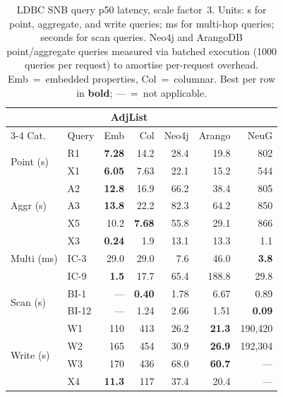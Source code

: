 \begin{table}[t]
  \centering
  \footnotesize
  \setlength{\tabcolsep}{3pt}
  \begin{tabular*}{\columnwidth}{@{\extracolsep{\fill}}ll rrrrr@{}}
    \toprule
    & & \multicolumn{2}{c}{\project{} AdjList} & & & \\
    \cmidrule(lr){3-4}
    Cat. & Query & Emb & Col & Neo4j & Arango & NeuG \\
    \midrule
    \multirow{2}{*}{Point (\textmu{}s)}
    & R1   & \textbf{7.28}  & 14.2  & 28.4  & 19.8  & 802 \\
    & X1   & \textbf{6.05}  & 7.63  & 22.1  & 15.2  & 544 \\
    \midrule
    \multirow{3}{*}{Aggr (\textmu{}s)}
    & A2   & \textbf{12.8}  & 16.9  & 66.2  & 38.4  & 805 \\
    & A3   & \textbf{13.8}  & 22.2  & 82.3  & 64.2  & 850 \\
    & X5   & 10.2  & \textbf{7.68}  & 55.8  & 29.1  & 866 \\
    \midrule
    \multirow{3}{*}{Multi (ms)}
    & X3   & \textbf{0.24}  & 1.9  & 13.1  & 13.3  & 1.1 \\
    & IC-3   & 29.0  & 29.0  & 7.6  & 46.0  & \textbf{3.8} \\
    & IC-9   & \textbf{1.5}  & 17.7  & 65.4  & 188.8  & 29.8 \\
    \midrule
    \multirow{2}{*}{Scan (s)}
    & BI-1   & ---  & \textbf{0.40}  & 1.78  & 6.67  & 0.89 \\
    & BI-12   & ---  & 1.24  & 2.66  & 1.51  & \textbf{0.09} \\
    \midrule
    \multirow{4}{*}{Write (\textmu{}s)}
    & W1   & 110  & 413  & 26.2  & \textbf{21.3}  & 190{,}420 \\
    & W2   & 165  & 454  & 30.9  & \textbf{26.9}  & 192{,}304 \\
    & W3   & 170  & 436  & 68.0  & \textbf{60.7}  & --- \\
    & X4   & \textbf{11.3}  & 117  & 37.4  & 20.4  & --- \\
    \bottomrule
  \end{tabular*}
  \caption{LDBC SNB query p50 latency, scale factor~3.
    Units: \textmu{}s for point, aggregate, and write queries;
    ms for multi-hop queries; seconds for scan queries.
    Neo4j and ArangoDB point/aggregate queries measured via batched execution
    (1000 queries per request) to amortise per-request overhead.
    Emb~=~embedded properties, Col~=~columnar.
    Best per row in \textbf{bold}; ---~=~not applicable.}
  \label{tab:ldbc-queries}
\end{table}

